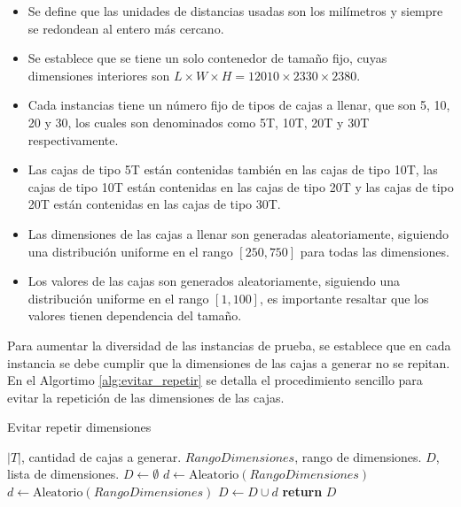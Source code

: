 \begin{itemize}
    \item Se define que las unidades de distancias usadas son los milímetros y siempre se redondean al entero más cercano.
    \item Se establece que se tiene un solo contenedor de tamaño fijo, cuyas dimensiones interiores son $L \times W \times H = 12010 \times 2330 \times 2380$.
    \item Cada instancias tiene un número fijo de tipos de cajas a llenar, que son 5, 10, 20 y 30, los cuales son denominados como 5T, 10T, 20T y 30T respectivamente.
    \item Las cajas de tipo 5T están contenidas también en las cajas de tipo 10T, las cajas de tipo 10T están contenidas en las cajas de tipo 20T y las cajas de tipo 20T están contenidas en las cajas de tipo 30T.
    \item Las dimensiones de las cajas a llenar son generadas aleatoriamente, siguiendo una distribución uniforme en el rango $[250, 750]$ para todas las dimensiones.
    \item Los valores de las cajas son generados aleatoriamente, siguiendo una distribución uniforme en el rango $[1, 100]$, es importante resaltar que los valores tienen dependencia del tamaño.
\end{itemize}

Para aumentar la diversidad de las instancias de prueba, se establece que en cada instancia se debe cumplir que la dimensiones de las cajas a generar no se repitan. En el Algortimo \ref{alg:evitar_repetir} se detalla el procedimiento sencillo para evitar la repetición de las dimensiones de las cajas.

\begin{algorithm}[H]
    \caption{Evitar repetir dimensiones}
    \label{alg:evitar_repetir}
    \begin{algorithmic}[1]
        \Require $|T|$, cantidad de cajas a generar.
        \Require $RangoDimensiones$, rango de dimensiones.
        \Ensure $D$, lista de dimensiones.
        \State $D \gets \emptyset$
        \State $d \gets \text{Aleatorio}(RangoDimensiones)$
        \State $d \gets \text{Aleatorio}(RangoDimensiones)$
        \EndWhile
        \State $D \gets D \cup d$
        \EndFor
        \State \textbf{return} $D$
    \end{algorithmic}
\end{algorithm}

